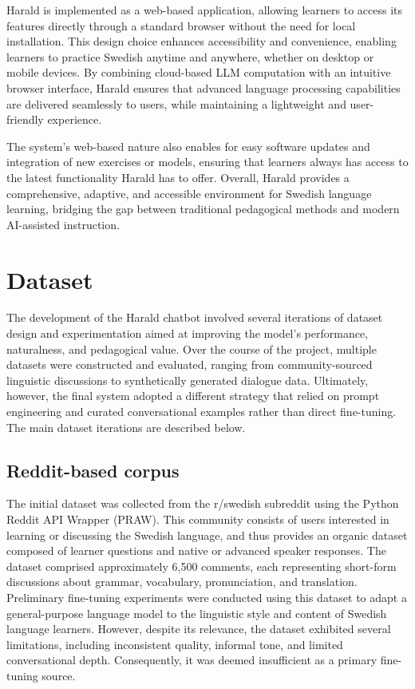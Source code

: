 \documentclass[a4paper,10pt]{article}
\begin{document}
Harald is implemented as a web-based application, allowing learners to access its features directly through a standard browser without the need for local installation. This design choice enhances accessibility and convenience, enabling learners to practice Swedish anytime and anywhere, whether on desktop or mobile devices. By combining cloud-based LLM computation with an intuitive browser interface, Harald ensures that advanced language processing capabilities are delivered seamlessly to users, while maintaining a lightweight and user-friendly experience.

The system’s web-based nature also enables for easy software updates and integration of new exercises or models, ensuring that learners always has access to the latest functionality Harald has to offer. Overall, Harald provides a comprehensive, adaptive, and accessible environment for Swedish language learning, bridging the gap between traditional pedagogical methods and modern AI-assisted instruction.

\section{Dataset}

The development of the Harald chatbot involved several iterations of dataset design and experimentation aimed at improving the model’s performance, naturalness, and pedagogical value. Over the course of the project, multiple datasets were constructed and evaluated, ranging from community-sourced linguistic discussions to synthetically generated dialogue data. Ultimately, however, the final system adopted a different strategy that relied on prompt engineering and curated conversational examples rather than direct fine-tuning. The main dataset iterations are described below.

\subsection{Reddit-based corpus}
The initial dataset was collected from the r/swedish subreddit using the Python Reddit API Wrapper (PRAW). This community consists of users interested in learning or discussing the Swedish language, and thus provides an organic dataset composed of learner questions and native or advanced speaker responses. The dataset comprised approximately 6,500 comments, each representing short-form discussions about grammar, vocabulary, pronunciation, and translation. Preliminary fine-tuning experiments were conducted using this dataset to adapt a general-purpose language model to the linguistic style and content of Swedish language learners. However, despite its relevance, the dataset exhibited several limitations, including inconsistent quality, informal tone, and limited conversational depth. Consequently, it was deemed insufficient as a primary fine-tuning source.
\end{document}
